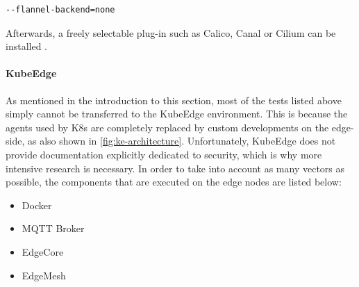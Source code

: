 \documentclass[MIC,Master,english]{twbook}%
\begin{document}
\begin{lstlisting}[caption={K3s no Flannel},captionpos=b]
--flannel-backend=none
\end{lstlisting}

Afterwards, a freely selectable plug-in such as Calico, Canal or Cilium can be installed \cite{k3s-network-conf}. 

\paragraph{KubeEdge} As mentioned in the introduction to this section, most of the tests listed above simply cannot be transferred to the KubeEdge environment. This is because the agents used by \ac{K8s} are completely replaced by custom developments on the edge-side, as also shown in \autoref{fig:ke-architecture}. Unfortunately, KubeEdge does not provide documentation explicitly dedicated to security, which is why more intensive research is necessary. In order to take into account as many vectors as possible, the components that are executed on the edge nodes are listed below:

\begin{itemize}
    \itemsep0em
    \item Docker
    \item MQTT Broker
    \item EdgeCore
    \item EdgeMesh
\end{itemize}
\end{document}
